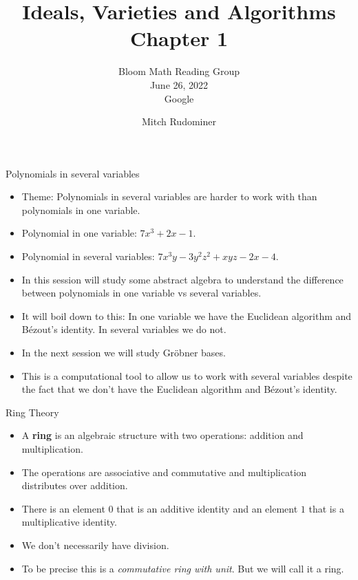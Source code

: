 \documentclass{beamer}
\title{Ideals, Varieties and Algorithms \\ Chapter 1}
\subtitle{Bloom Math Reading Group \\ June 26, 2022 \\ Google}
\author{Mitch Rudominer}
\date{}
\begin{document}
\begin{frame}
  \titlepage
\end{frame}

\begin{frame}{Polynomials in several variables}


\begin{itemize}
  \item Theme: Polynomials in several variables are harder to work with than polynomials in one variable.
  \item Polynomial in one variable: $7x^3 + 2x - 1$.
  \item Polynomial in several variables: $7x^3y - 3y^2z^2 + xyz -2x - 4$.
  \item In this session will study some abstract algebra to understand the difference between polynomials in one variable vs several variables.
  \item It will boil down to this: In one variable we have the Euclidean algorithm and B\'{e}zout's identity. In several variables we do not.
  \item In the next session we will study Gr\"{o}bner bases.
  \item This is a computational tool to allow us to work with several variables despite the fact that we don't have the Euclidean algorithm and B\'{e}zout's identity.
\end{itemize}

\end{frame}



\begin{frame}{Ring Theory}

\begin{itemize}
  \item A \textbf{ring} is an algebraic structure with two operations: addition and multiplication.
  \item The operations are associative and commutative and multiplication distributes over addition.
  \item There is an element $0$ that is an additive identity and an element $1$ that is a multiplicative identity.
  \item We don't necessarily have division.
  \item To be precise this is a \emph{commutative ring with unit}. But we will call it a ring.
\end{itemize}

\end{frame}
\end{document}
